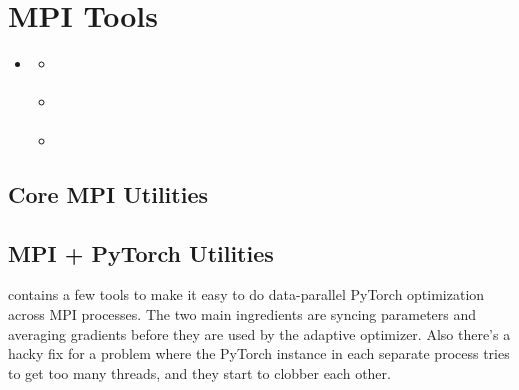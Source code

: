 \documentclass[letterpaper,10pt,english]{sphinxmanual}
\begin{document}
\chapter{MPI Tools}
\label{\detokenize{utils/mpi:mpi-tools}}\label{\detokenize{utils/mpi::doc}}
\begin{sphinxShadowBox}
\begin{itemize}
\item {} 
\label{\detokenize{utils/mpi:id1}}{\hyperref[\detokenize{utils/mpi:mpi-tools}]{}}
\begin{itemize}
\item {} 
\label{\detokenize{utils/mpi:id2}}{\hyperref[\detokenize{utils/mpi:core-mpi-utilities}]{}}

\item {} 
\label{\detokenize{utils/mpi:id3}}{\hyperref[\detokenize{utils/mpi:mpi-pytorch-utilities}]{}}

\item {} 
\label{\detokenize{utils/mpi:id4}}{\hyperref[\detokenize{utils/mpi:mpi-tensorflow-utilities}]{}}

\end{itemize}

\end{itemize}
\end{sphinxShadowBox}


\section{Core MPI Utilities}
\label{\detokenize{utils/mpi:core-mpi-utilities}}

\section{MPI + PyTorch Utilities}
\label{\detokenize{utils/mpi:mpi-pytorch-utilities}}
 contains a few tools to make it easy to do data-parallel PyTorch optimization across MPI processes. The two main ingredients are syncing parameters and averaging gradients before they are used by the adaptive optimizer. Also there’s a hacky fix for a problem where the PyTorch instance in each separate process tries to get too many threads, and they start to clobber each other.
\end{document}
